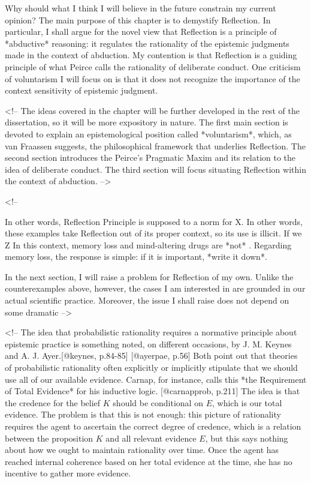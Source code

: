 Why should what I think I will believe in the future constrain my
current opinion? The main purpose of this chapter is to demystify
Reflection. In particular, I shall argue for the novel view that
Reflection is a principle of *abductive* reasoning: it regulates the
rationality of the epistemic judgments made in the context of abduction.
My contention is that Reflection is a guiding principle of what Peirce
calls the rationality of deliberate conduct. One criticism of
voluntarism I will focus on is that it does not recognize the importance
of the context sensitivity of epistemic judgment.

\textless{}!-- The ideas covered in the chapter will be further
developed in the rest of the dissertation, so it will be more expository
in nature. The first main section is devoted to explain an
epistemological position called *voluntarism*, which, as van Fraassen
suggests, the philosophical framework that underlies Reflection. The
second section introduces the Peirce's Pragmatic Maxim and its relation
to the idea of deliberate conduct. The third section will focus
situating Reflection within the context of abduction. --\textgreater{}

\textless{}!--

In other words, Reflection Principle is supposed to a norm for X. In
other words, these examples take Reflection out of its proper context,
so its use is illicit. If we Z In this context, memory loss and
mind-altering drugs are *not* . Regarding memory loss, the response is
simple: if it is important, *write it down*.

In the next section, I will raise a problem for Reflection of my own.
Unlike the counterexamples above, however, the cases I am interested in
are grounded in our actual scientific practice. Moreover, the issue I
shall raise does not depend on some dramatic --\textgreater{}

\textless{}!-- The idea that probabilistic rationality requires a
normative principle about epistemic practice is something noted, on
different occasions, by J. M. Keynes and A. J. Ayer.{[}@keynes,
p.84-85{]} {[}@ayerpae, p.56{]} Both point out that theories of
probabilistic rationality often explicitly or implicitly stipulate that
we should use all of our available evidence. Carnap, for instance, calls
this *the Requirement of Total Evidence* for his inductive logic.
{[}@carnapprob, p.211{]} The idea is that the credence for the belief
\(K\) should be conditional on \(E\), which is our total evidence. The
problem is that this is not enough: this picture of rationality requires
the agent to ascertain the correct degree of credence, which is a
relation between the proposition \(K\) and all relevant evidence \(E\),
but this says nothing about how we ought to maintain rationality over
time. Once the agent has reached internal coherence based on her total
evidence at the time, she has no incentive to gather more evidence.

